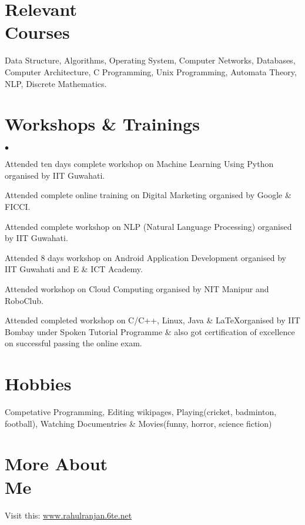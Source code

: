 \documentclass[margin,line]{res}
\newenvironment{list2}{
  \begin{list}{$\bullet$}{%
      \setlength{\itemsep}{0in}
      \setlength{\parsep}{0in} \setlength{\parskip}{0in}
      \setlength{\topsep}{0in} \setlength{\partopsep}{0in}
      \setlength{\leftmargin}{0.2in}}}{\end{list}}
\begin{document}
\begin{resume}
\section{\sc Relevant \\ Courses}
Data Structure, Algorithms, Operating System,   Computer Networks, Databases, Computer Architecture, C Programming, Unix Programming, Automata Theory, NLP, Discrete Mathematics.

\section{\sc Workshops \& Trainings}
\begin{list2}
\item Attended ten days complete workshop on Machine Learning Using Python organised by IIT Guwahati.
\item Attended complete online training on Digital Marketing organised by Google \& FICCI.\\
\item Attended complete workshop on NLP (Natural Language Processing) organised by IIT Guwahati. 
\item Attended 8 days workshop on Android Application Development organised by IIT Guwahati and E \& ICT Academy.
\item Attended workshop on Cloud Computing organised by NIT Manipur and RoboClub.
\item Attended completed workshop on C/C++, Linux, Java \& \LaTeX  organised by IIT Bombay under Spoken Tutorial Programme \& also got certification of excellence on successful passing the online exam.


\end{list2}
\section{\sc Hobbies}
Competative Programming, Editing wikipages, Playing(cricket, badminton, football), Watching Documentries \& Movies(funny, horror, science fiction)


\section{\sc More About \\Me }
Visit this: \url{www.rahulranjan.6te.net}

\end{resume}
\end{document}
